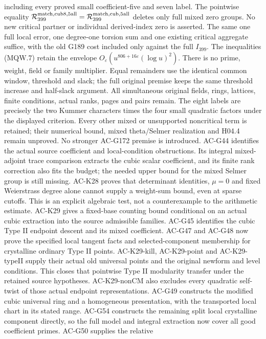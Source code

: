 \documentclass[11pt,a4paper]{article}
\theoremstyle{definition}
\theoremstyle{remark}
\begin{document}
including every proved small coefficient-five and seven label.
The pointwise equality
$\mathcal R_{399}^{\rm match,cub8,5all}
 =\mathcal R_{399}^{\rm match,cub,5all}$
deletes only full mixed zero groups. No new critical partner
or individual derived-index zero is asserted.
The same one full local error, one degree-one torsion sum and
one existing critical aggregate suffice, with the old G189
cost included only against the full $I_{399}$.
The inequalities (MQW.7) retain the envelope
$O_\varepsilon(u^{806+16\varepsilon}(\log u)^2)$.
There is no prime, weight, field or family multiplier.
Equal remainders use the identical common window, threshold and
slack; the full original premise keeps the same threshold increase
and half-slack argument. All simultaneous original fields, rings,
lattices, finite conditions, actual ranks, pages and pairs remain.
The eight labels are precisely the two Kummer characters times
the four small quadratic factors under the displayed criterion.
Every other mixed or unsupported noncritical term is retained;
their numerical bound, mixed theta/Selmer realization and H04.4
remain unproved. No stronger AC-G172 premise is introduced.
AC-G44 identifies the actual source coefficient and local-condition
obstructions. Its integral mixed-adjoint trace comparison extracts
the cubic scalar coefficient, and its finite rank correction also
fits the budget; the needed upper bound for the mixed Selmer group
is still missing. AC-K28 proves that determinant identities,
$\mu=0$ and fixed Weierstrass degree alone cannot supply a
weight-sum bound, even at sparse cutoffs. This is an explicit
algebraic test, not a counterexample to the arithmetic estimate.
AC-K29 gives a fixed-base counting bound conditional on an actual
cubic extraction into the source admissible families. AC-G45 identifies
the cubic Type II endpoint descent and its mixed coefficient.
AC-G47 and AC-G48 now prove the specified local tangent facts and
selected-component membership for crystalline ordinary Type II points.
AC-K29-kill, AC-K29-point and AC-K29-typeII supply their actual old
universal points and the original newform and level conditions.
This closes that pointwise Type II modularity transfer under the
retained source hypotheses. AC-K29-nonCM also excludes every quadratic
self-twist of those actual endpoint representations. AC-G49 constructs
the modified cubic universal ring and a homogeneous presentation, with
the transported local chart in its stated range. AC-G54 constructs the
remaining split local crystalline component directly, so the full model
and integral extraction now cover all good coefficient primes. AC-G50 supplies the relative
\end{document}
